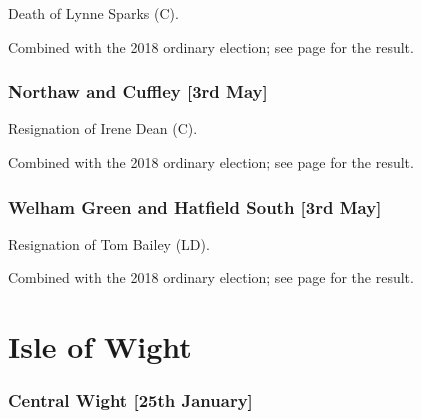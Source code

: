\documentclass[a4paper,openany]{book}
\begin{document}
\begin{resultsiii}

Death of Lynne Sparks (C).

Combined with the 2018 ordinary election; see page \pageref{HatfieldVillagesWelwynHatfield} for the result.

\subsubsection*{Northaw and Cuffley \hspace*{\fill}\nolinebreak[1]%
\enspace\hspace*{\fill}
[3rd May]}


Resignation of Irene Dean (C).

Combined with the 2018 ordinary election; see page \pageref{NorthawCuffleyWelwynHatfield} for the result.

\subsubsection*{Welham Green and Hatfield South \hspace*{\fill}\nolinebreak[1]%
\enspace\hspace*{\fill}
[3rd May]}


Resignation of Tom Bailey (LD).

Combined with the 2018 ordinary election; see page \pageref{WelhamGreenHatfieldSouthWelwynHatfield} for the result.

\section{Isle of Wight}

\subsubsection*{Central Wight \hspace*{\fill}\nolinebreak[1]%
\enspace\hspace*{\fill}
[25th January]}



\end{resultsiii}
\end{document}
